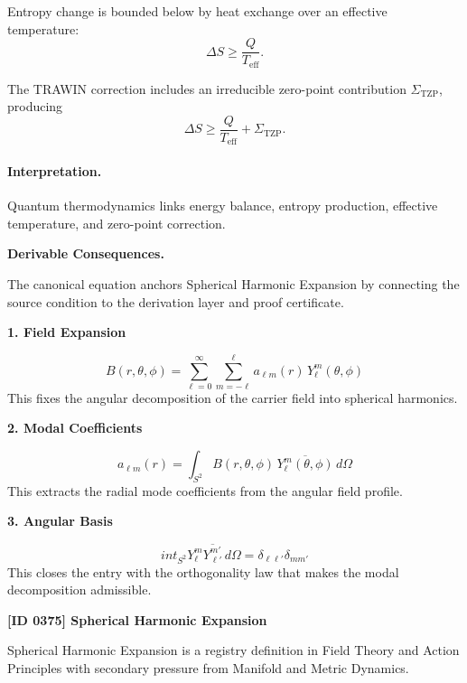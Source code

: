 Entropy change is bounded below by heat exchange over an effective temperature:
\begin{equation}
\Delta S\geq \frac{Q}{T_{\mathrm{eff}}}.
\end{equation}

The TRAWIN correction includes an irreducible zero-point contribution $\Sigma_{\mathrm{TZP}}$, producing
\begin{equation}
\boxed{
\Delta S
\geq
\frac{Q}{T_{\mathrm{eff}}}
+
\Sigma_{\mathrm{TZP}} .
}
\end{equation}

\paragraph{Interpretation.}
Quantum thermodynamics links energy balance, entropy production, effective temperature, and zero-point correction.

\par\vspace{0.35em}
\noindent\textbf{Derivable Consequences.}\quad
\begingroup
\footnotesize
\raggedright
The canonical equation anchors Spherical Harmonic Expansion by connecting the source condition to the derivation layer and proof certificate.
\par\endgroup

\noindent\textbf{1. Field Expansion}\par
\[
B(r,\theta,\phi)=\sum_{\ell=0}^{\infty}\sum_{m=-\ell}^{\ell} a_{\ell m}(r)\,Y_{\ell}^{m}(\theta,\phi)
\]
\noindent This fixes the angular decomposition of the carrier field into spherical harmonics.\par
\noindent\textbf{2. Modal Coefficients}\par
\[
a_{\ell m}(r)=\int_{S^2} B(r,\theta,\phi)\,\overline{Y_{\ell}^{m}(\theta,\phi)}\,d\Omega
\]
\noindent This extracts the radial mode coefficients from the angular field profile.\par
\noindent\textbf{3. Angular Basis}\par
\[
int_{S^2}Y_{\ell}^{m}\overline{Y_{\ell'}^{m'}}\,d\Omega=\delta_{\ell\ell'}\delta_{mm'}
\]
\noindent This closes the entry with the orthogonality law that makes the modal decomposition admissible.\par

\clearpage
\noindent\textbf{[ID 0375] Spherical Harmonic Expansion}\par
\vspace{0.35em}
\begingroup\small
{}
Spherical Harmonic Expansion is a registry definition in Field Theory and Action Principles with secondary pressure from Manifold and Metric Dynamics.

